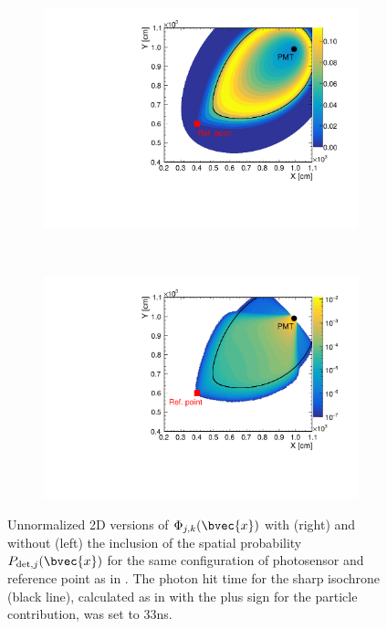 \begin{figure}[b!t]
  \centering
  \begin{subfigure}[t]{0.48\textwidth}     
    \includegraphics[trim=0.1cm 0.1cm 0.0cm 0.1cm,clip=true,width=\textwidth]
      {recon/SmearedDropShapeII.pdf}
  \end{subfigure}
  ~
  \begin{subfigure}[t]{0.48\textwidth}
    \includegraphics[trim=0.1cm 0.1cm 0.0cm 0.1cm,clip=true,width=\textwidth]
      {recon/SmearedDropShapeLDII.pdf}
  \end{subfigure}
  \caption{Unnormalized 2D versions of $\Phi_{j,k}(\bvec{x})$ with (right) and without (left) the 
inclusion of the spatial probability $P_{\mathrm{det},j}(\bvec{x})$ for the same configuration of 
photosensor and reference point as in . The photon hit time for the sharp 
isochrone (black line), calculated as in  with the plus sign for the 
particle contribution, was set to $33$\unit{ns}.}
  \label{fig:SmearedDropShape}
\end{figure}
